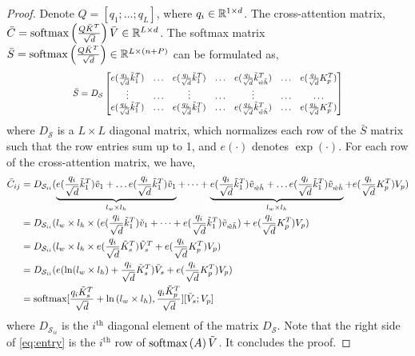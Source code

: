 \begin{proof}
Denote $Q = [q_1; \dots; q_L]$, where $q_i \in \mathbb{R}^{1 \times d}$. The cross-attention matrix, $\Bar{C} = \text{softmax}\left(\frac{Q\Bar{K}^{T}}{\sqrt{d}}\right)\Bar{V} \in \mathbb{R}^{L\times d}$. The softmax matrix $\bar{S} = \text{softmax}\left(\frac{Q\Bar{K}^{T}}{\sqrt{d}}\right) \in \mathbb{R}^{L\times (n+P)}$ can be formulated as, 
\begin{equation*}
\resizebox{0.7\linewidth}{!}{$
\bar{S} = D_{\mathcal{S}}\begin{bmatrix} 
    e(\frac{q_1}{\sqrt{d}}\Tilde{k}_1^T) & \dots & e(\frac{q_1}{\sqrt{d}}\Tilde{k}_1^T) &\dots & e(\frac{q_1}{\sqrt{d}}\Tilde{k}_{\Tilde{w}\Tilde{h}}^T) & \dots & e(\frac{q_1}{\sqrt{d}}K_p^T)\\
    \vdots & \dots & \vdots & \dots & \vdots &\dots & \dots \\
    e(\frac{q_L}{\sqrt{d}}\Tilde{k}_1^T) & \dots  & e(\frac{q_L}{\sqrt{d}}\Tilde{k}_1^T) &\dots & e(\frac{q_L}{\sqrt{d}}\Tilde{k}_{\Tilde{w}\Tilde{h}}^T) & \dots & e(\frac{q_L}{\sqrt{d}}K_p^T)
    \end{bmatrix}$}
\end{equation*}
where $D_{\mathcal{S}}$ is a $L\times L$ diagonal matrix, which normalizes each row of the $\bar{S}$ matrix such that the row entries sum up to 1, and $e(\cdot)$ denotes $\exp(\cdot)$. 
For each row of the cross-attention matrix, we have, 
\begin{align}\label{eq:entry}
    \Bar{C}_{ij} & = D_{{\mathcal{S}}_{ii}}(\underbrace{e(\frac{q_i}{\sqrt{d}}\Tilde{k}_1^T)\Tilde{v}_1 + \dots e(\frac{q_i}{\sqrt{d}}\Tilde{k}_1^T)\Tilde{v}_1}_{l_w\times l_h} 
     + \dots + \underbrace{e(\frac{q_i}{\sqrt{d}}\Tilde{k}_1^T)\Tilde{v}_{\Tilde{w}\Tilde{h}}  + \dots e(\frac{q_i}{\sqrt{d}}\Tilde{k}_1^T)\Tilde{v}_{\Tilde{w}\Tilde{h}}}_{l_w\times l_h}  + e(\frac{q_i}{\sqrt{d}}K_p^T)V_p) \nonumber \\ 
    &= D_{{\mathcal{S}}_{ii}}(l_w\times l_h\times (e(\frac{q_i}{\sqrt{d}}\Tilde{k}_1^T)\Tilde{v}_1 + \dots +  e(\frac{q_i}{\sqrt{d}}\Tilde{k}_1^T)\Tilde{v}_{\Tilde{w}\Tilde{h}}) + e(\frac{q_i}{\sqrt{d}}K_p^T)V_p) \nonumber \\ 
    & = D_{{\mathcal{S}}_{ii}}(l_w\times l_h \times e(\frac{q_i}{\sqrt{d}}\Tilde{K}_s^T)\Tilde{V}_s^T + e(\frac{q_i}{\sqrt{d}}K_p^T)V_p) \nonumber \\ 
    & = D_{{\mathcal{S}}_{ii}}(e(\ln(l_w\times l_h) + \frac{q_i}{\sqrt{d}}\Tilde{K}_s^T)\Tilde{V}_s + e(\frac{q_i}{\sqrt{d}}K_p^T)V_p) \nonumber \\ 
    & = \text{softmax}[\frac{q_i\Tilde{K}_s^{T}}{\sqrt{d}} + \ln{(l_w\times l_h)}, \frac{q_i\Tilde{K}_p^{T}}{\sqrt{d}}][\Tilde{V}_s; V_p] 
\end{align}
where $D_{{\mathcal{S}}_{ii}}$ is the $i^{\text{th}}$ diagonal element of the matrix $D_{\mathcal{S}}$. Note that the right side of \cref{eq:entry} is the $i^{\text{th}}$ row of $\text{softmax}\left( A \right)\Tilde{V}$.
It concludes the proof. 
\end{proof}

